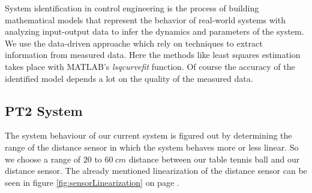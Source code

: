 System identification in control engineering is the process of building mathematical models that represent the behavior of real-world systems with analyzing input-output data to infer the dynamics and parameters of the system. We use the data-driven approache which rely on techniques to extract information from measured data. Here the methods like least squares estimation takes place with MATLAB's \textit{lsqcurvefit} function. Of course the accuracy of the identified model depends a lot on the quality of the measured data.

\subsection{PT2 System}
The system behaviour of our current system is figured out by determining the range of the distance sensor in which the system behaves more or less linear. So we choose a range of $20$ to $\SI{60}{cm}$ distance between our table tennis ball and our distance sensor. The already mentioned linearization of the distance sensor can be seen in figure \ref{fig:sensorLinearization} on page \pageref{fig:sensorLinearization}. 

